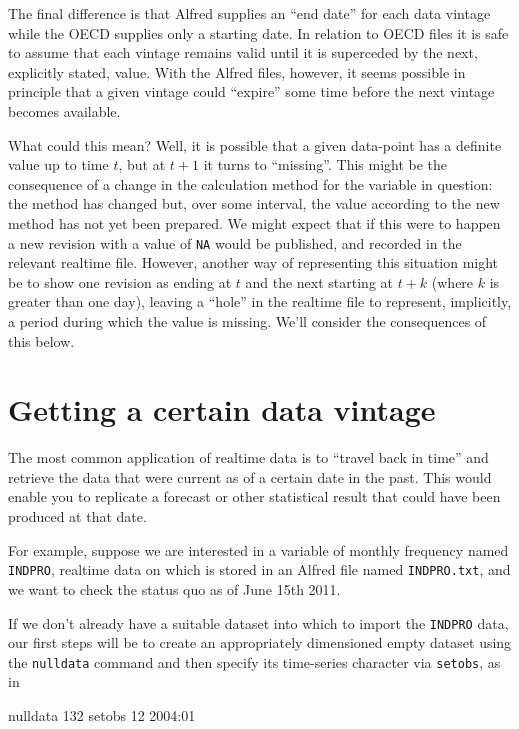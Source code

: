 The final difference is that Alfred supplies an ``end date'' for each
data vintage while the OECD supplies only a starting date. In relation
to OECD files it is safe to assume that each vintage remains valid
until it is superceded by the next, explicitly stated, value. With the
Alfred files, however, it seems possible in principle that a given
vintage could ``expire'' some time before the next vintage becomes
available.

What could this mean? Well, it is possible that a given data-point has
a definite value up to time $t$, but at $t+1$ it turns to
``missing''. This might be the consequence of a change in the
calculation method for the variable in question: the method has
changed but, over some interval, the value according to the new method
has not yet been prepared. We might expect that if this were to happen
a new revision with a value of \texttt{NA} would be published, and
recorded in the relevant realtime file. However, another way of
representing this situation might be to show one revision as ending at
$t$ and the next starting at $t+k$ (where $k$ is greater than one
day), leaving a ``hole'' in the realtime file to represent,
implicitly, a period during which the value is missing. We'll consider
the consequences of this below.

\section{Getting a certain data vintage}
\label{sec:realtime-vintage}

The most common application of realtime data is to ``travel back in
time'' and retrieve the data that were current as of a certain date
in the past. This would enable you to replicate a forecast or other
statistical result that could have been produced at that date.

For example, suppose we are interested in a variable of monthly
frequency named \texttt{INDPRO}, realtime data on which is stored in
an Alfred file named \texttt{INDPRO.txt}, and we want to check the
status quo as of June 15th 2011.

If we don't already have a suitable dataset into which to import the
\texttt{INDPRO} data, our first steps will be to create an
appropriately dimensioned empty dataset using the \texttt{nulldata}
command and then specify its time-series character via
\texttt{setobs}, as in
\begin{code}
nulldata 132
setobs 12 2004:01
\end{code}

